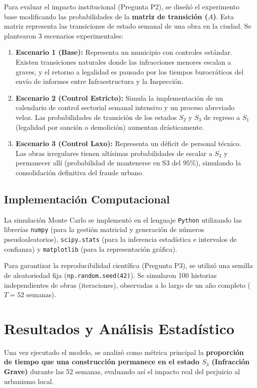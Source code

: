 \documentclass[12pt,letterpaper]{article}
\begin{document}
Para evaluar el impacto institucional (Pregunta P2), se diseñó el experimento base modificando las probabilidades de la \textbf{matriz de transición ($A$)}. Esta matriz representa las transiciones de estado semanal de una obra en la ciudad.
Se plantearon 3 escenarios experimentales:
\begin{enumerate}
    \item \textbf{Escenario 1 (Base):} Representa un municipio con controles estándar. Existen transiciones naturales donde las infracciones menores escalan a graves, y el retorno a legalidad es pausado por los tiempos burocráticos del envío de informes entre Infraestructura y la Inspección.
    \item \textbf{Escenario 2 (Control Estricto):} Simula la implementación de un calendario de control sectorial semanal intensivo y un proceso abreviado veloz. Las probabilidades de transición de los estados $S_2$ y $S_3$ de regreso a $S_1$ (legalidad por sanción o demolición) aumentan drásticamente.
    \item \textbf{Escenario 3 (Control Laxo):} Representa un déficit de personal técnico. Las obras irregulares tienen altísimas probabilidades de escalar a $S_3$ y permanecer allí (probabilidad de mantenerse en S3 del $95\%$), simulando la consolidación definitiva del fraude urbano.
\end{enumerate}

\subsection{Implementación Computacional}
La simulación Monte Carlo se implementó en el lenguaje \texttt{Python} utilizando las librerías \texttt{numpy} (para la gestión matricial y generación de números pseudoaleatorios), \texttt{scipy.stats} (para la inferencia estadística e intervalos de confianza) y \texttt{matplotlib} (para la representación gráfica). 

Para garantizar la reproducibilidad científica (Pregunta P3), se utilizó una semilla de aleatoriedad fija (\texttt{np.random.seed(42)}). Se simularon 100 historias independientes de obras (iteraciones), observadas a lo largo de un año completo ($T = 52$ semanas). 

\section{Resultados y Análisis Estadístico}
Una vez ejecutado el modelo, se analizó como métrica principal la \textbf{proporción de tiempo que una construcción permanece en el estado $S_3$ (Infracción Grave)} durante las 52 semanas, evaluando así el impacto real del perjuicio al urbanismo local.
\end{document}
